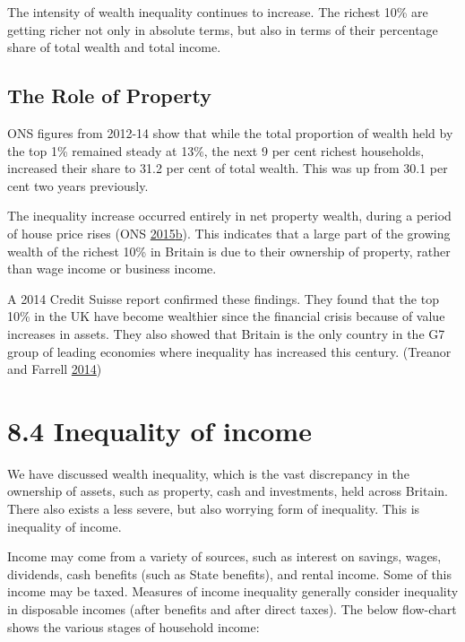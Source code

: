\documentclass[]{tufte-handout}
\begin{document}
The intensity of wealth inequality continues to increase. The richest
10\% are getting richer not only in absolute terms, but also in terms of
their percentage share of total wealth and total income.

\hypertarget{the-role-of-property}{%
\subsection{The Role of Property}\label{the-role-of-property}}

ONS figures from 2012-14 show that while the total proportion of wealth
held by the top 1\% remained steady at 13\%, the next 9 per cent richest
households, increased their share to 31.2 per cent of total wealth. This
was up from 30.1 per cent two years previously.

The inequality increase occurred entirely in net property wealth, during
a period of house price rises (ONS
\protect\hyperlink{ref-ONSWELLBEING2015}{2015}\protect\hyperlink{ref-ONSWELLBEING2015}{b}).
This indicates that a large part of the growing wealth of the richest
10\% in Britain is due to their ownership of property, rather than wage
income or business income.

A 2014 Credit Suisse report confirmed these findings. They found that
the top 10\% in the UK have become wealthier since the financial crisis
because of value increases in assets. They also showed that Britain is
the only country in the G7 group of leading economies where inequality
has increased this century. (Treanor and Farrell
\protect\hyperlink{ref-TreanorFarrell2014}{2014})

\hypertarget{inequality-of-income}{%
\section{8.4 Inequality of income}\label{inequality-of-income}}

We have discussed wealth inequality, which is the vast discrepancy in
the ownership of assets, such as property, cash and investments, held
across Britain. There also exists a less severe, but also worrying form
of inequality. This is inequality of income.

Income may come from a variety of sources, such as interest on savings,
wages, dividends, cash benefits (such as State benefits), and rental
income. Some of this income may be taxed. Measures of income inequality
generally consider inequality in disposable incomes (after benefits and
after direct taxes). The below flow-chart shows the various stages of
household income:
\end{document}
